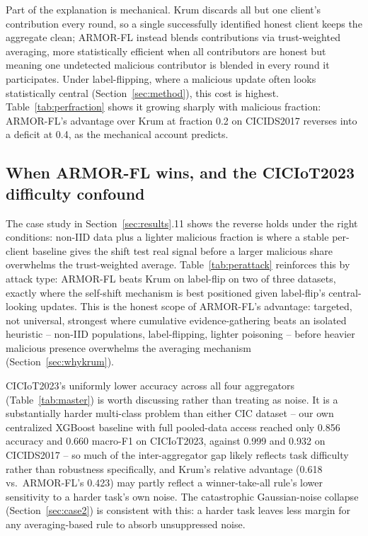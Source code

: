 \documentclass[pdflatex,iicol,sn-mathphys-num]{sn-jnl}%
\theoremstyle{thmstyleone}%
\theoremstyle{thmstyletwo}%
\theoremstyle{thmstylethree}%
\begin{document}
Part of the explanation is mechanical. Krum discards all but one client's contribution every round, so a single successfully identified honest client keeps the aggregate clean; ARMOR-FL instead blends contributions via trust-weighted averaging, more statistically efficient when all contributors are honest but meaning one undetected malicious contributor is blended in every round it participates. Under label-flipping, where a malicious update often looks statistically central (Section~\ref{sec:method}), this cost is highest. Table~\ref{tab:perfraction} shows it growing sharply with malicious fraction: ARMOR-FL's advantage over Krum at fraction 0.2 on CICIDS2017 reverses into a deficit at 0.4, as the mechanical account predicts.

\subsection{When ARMOR-FL wins, and the CICIoT2023 difficulty confound}\label{sec:whenarmor}

The case study in Section~\ref{sec:results}.11 shows the reverse holds under the right conditions: non-IID data plus a lighter malicious fraction is where a stable per-client baseline gives the shift test real signal before a larger malicious share overwhelms the trust-weighted average. Table~\ref{tab:perattack} reinforces this by attack type: ARMOR-FL beats Krum on label-flip on two of three datasets, exactly where the self-shift mechanism is best positioned given label-flip's central-looking updates. This is the honest scope of ARMOR-FL's advantage: targeted, not universal, strongest where cumulative evidence-gathering beats an isolated heuristic -- non-IID populations, label-flipping, lighter poisoning -- before heavier malicious presence overwhelms the averaging mechanism (Section~\ref{sec:whykrum}).

CICIoT2023's uniformly lower accuracy across all four aggregators (Table~\ref{tab:master}) is worth discussing rather than treating as noise. It is a substantially harder multi-class problem than either CIC dataset -- our own centralized XGBoost baseline with full pooled-data access reached only 0.856 accuracy and 0.660 macro-F1 on CICIoT2023, against 0.999 and 0.932 on CICIDS2017 -- so much of the inter-aggregator gap likely reflects task difficulty rather than robustness specifically, and Krum's relative advantage (0.618 vs.\ ARMOR-FL's 0.423) may partly reflect a winner-take-all rule's lower sensitivity to a harder task's own noise. The catastrophic Gaussian-noise collapse (Section~\ref{sec:case2}) is consistent with this: a harder task leaves less margin for any averaging-based rule to absorb unsuppressed noise.
\end{document}

